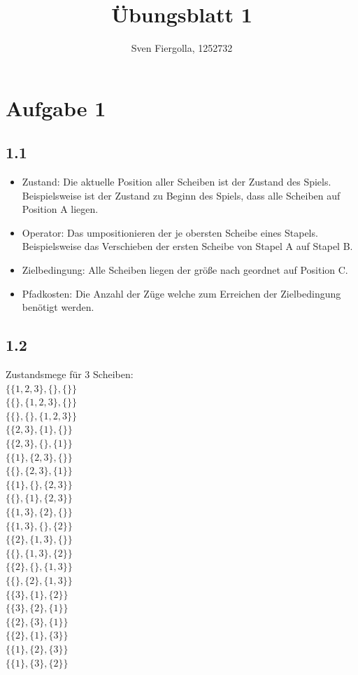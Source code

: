 \documentclass[10pt, a4paper]{article}
\title{Übungsblatt 1}
\author{Sven Fiergolla, 1252732}
\begin{document}
\maketitle

\section*{Aufgabe 1}
\subsection*{1.1}
\begin{itemize}
\item Zustand: Die aktuelle Position aller Scheiben ist der Zustand des Spiels. Beispielsweise ist der Zustand zu Beginn des Spiels, dass alle Scheiben auf Position A liegen.
\item Operator: Das umpositionieren der je obersten Scheibe eines Stapels. Beispielsweise das Verschieben der ersten Scheibe von Stapel A auf Stapel B.
\item Zielbedingung: Alle Scheiben liegen der größe nach geordnet auf Position C.
\item Pfadkosten: Die Anzahl der Züge welche zum Erreichen der Zielbedingung benötigt werden.
\end{itemize}

\subsection*{1.2}
Zustandsmege für 3 Scheiben:\\
$\{\{1,2,3\},\{\},\{\}\}$\\
$\{\{\},\{1,2,3\},\{\}\}$\\\medskip
$\{\{\},\{\},\{1,2,3\}\}$\\ 
$\{\{2,3\},\{1\},\{\}\}$\\
$\{\{2,3\},\{\},\{1\}\}$\\
$\{\{1\},\{2,3\},\{\}\}$\\
$\{\{\},\{2,3\},\{1\}\}$\\
$\{\{1\},\{\},\{2,3\}\}$\\\medskip
$\{\{\},\{1\},\{2,3\}\}$\\
$\{\{1,3\},\{2\},\{\}\}$\\
$\{\{1,3\},\{\},\{2\}\}$\\
$\{\{2\},\{1,3\},\{\}\}$\\
$\{\{\},\{1,3\},\{2\}\}$\\
$\{\{2\},\{\},\{1,3\}\}$\\\medskip
$\{\{\},\{2\},\{1,3\}\}$\\ 
$\{\{3\},\{1\},\{2\}\}$\\
$\{\{3\},\{2\},\{1\}\}$\\
$\{\{2\},\{3\},\{1\}\}$\\
$\{\{2\},\{1\},\{3\}\}$\\
$\{\{1\},\{2\},\{3\}\}$\\
$\{\{1\},\{3\},\{2\}\}$\\
\end{document}
